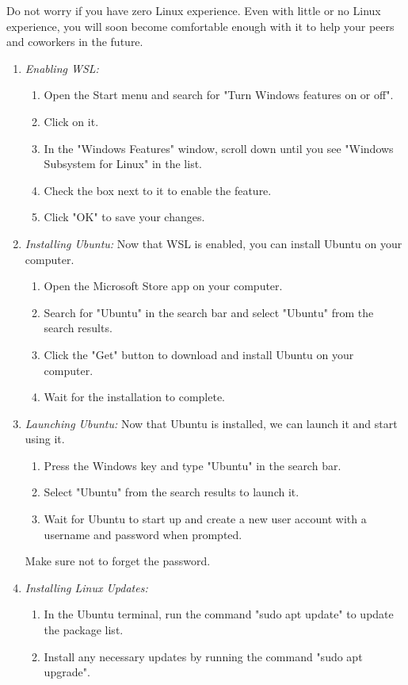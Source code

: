 \noindent Do not worry if you have zero Linux experience. Even with little or no Linux experience, you will soon become comfortable enough with it to help your peers and coworkers in the future.
\begin{enumerate}
\item \emph{Enabling WSL:}
\begin{enumerate}
    \item Open the Start menu and search for "Turn Windows features on or off". 
    \item Click on it.
    \item In the "Windows Features" window, scroll down until you see "Windows Subsystem for Linux" in the list. 
    \item Check the box next to it to enable the feature.
    \item Click "OK" to save your changes. 
\end{enumerate}

\item \emph{Installing Ubuntu:}
Now that WSL is enabled, you can install Ubuntu on your computer.
\begin{enumerate}
\item Open the Microsoft Store app on your computer.
\item Search for "Ubuntu" in the search bar and select "Ubuntu" from the search results.
\item Click the "Get" button to download and install Ubuntu on your computer.
\item Wait for the installation to complete.
\end{enumerate}

\item \emph{Launching Ubuntu:}
Now that Ubuntu is installed, we can launch it and start using it.
\begin{enumerate}
\item Press the Windows key and type "Ubuntu" in the search bar. 
\item Select "Ubuntu" from the search results to launch it.
\item Wait for Ubuntu to start up and create a new user account with a username and password when prompted.
\end{enumerate}
Make sure not to forget the password.

\item \emph{Installing Linux Updates:}
\begin{enumerate}

\item In the Ubuntu terminal, run the command "sudo apt update" to update the package list.
\item Install any necessary updates by running the command "sudo apt upgrade".
\end{enumerate}


\end{enumerate}
